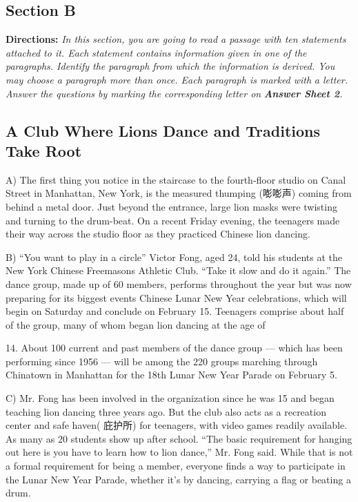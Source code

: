 \documentclass[UTF8,11pt]{ctexart}
\begin{document}
\subsection*{\textbf{Section B}}


\textbf{Directions:} \textit{In this section, you are going to read a passage with ten statements attached to it. Each} \textit{statement contains information given in one of the paragraphs. Identify the paragraph from which the} \textit{information is derived. You may choose a paragraph more than once. Each paragraph is marked with} \textit{a letter. Answer the questions by marking the corresponding letter on }\textbf{\textit{Answer Sheet 2}}\textit{.}


\subsection*{\textbf{A Club Where Lions Dance and Traditions Take Root}}


A) The first thing you notice in the staircase to the fourth-floor studio on Canal Street in Manhattan, New York, is the measured thumping (嘭嘭声) coming from behind a metal door. Just beyond the entrance, large lion masks were twisting and turning to the drum-beat. On a recent Friday evening, the teenagers made their way across the studio floor as they practiced Chinese lion dancing.


B) “You want to play in a circle” Victor Fong, aged 24, told his students at the New York Chinese Freemasons Athletic Club. “Take it slow and do it again.” The dance group, made up of 60 members, performs throughout the year but was now preparing for its biggest events Chinese Lunar New Year celebrations, which will begin on Saturday and conclude on February 15. Teenagers comprise about half of the group, many of whom began lion dancing at the age of


14. About 100 current and past members of the dance group — which has been performing since 1956 — will be among the 220 groups marching through Chinatown in Manhattan for the 18th Lunar New Year Parade on February 5.


C) Mr. Fong has been involved in the organization since he was 15 and began teaching lion dancing three years ago. But the club also acts as a recreation center and safe haven( 庇护所) for teenagers, with video games readily available. As many as 20 students show up after school. “The basic requirement for hanging out here is you have to learn how to lion dance,” Mr. Fong said. While that is not a formal requirement for being a member, everyone finds a way to participate in the Lunar New Year Parade, whether it’s by dancing, carrying a flag or beating a drum.
\end{document}
